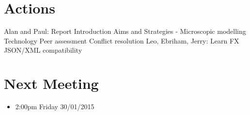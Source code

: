 \documentclass{article}
\begin{document}
\section {Actions}
Alan and Paul: 
\newline
Report
Introduction 
Aims and Strategies - Microscopic modelling 
Technology 
Peer assessment 
Conflict resolution 
\newline
\newline
Leo, Ebriham, Jerry:
Learn FX
JSON/XML compatibility 

\section {Next Meeting}
\begin{itemize}
\item 2:00pm Friday 30/01/2015
\end{itemize}
\end{document}
